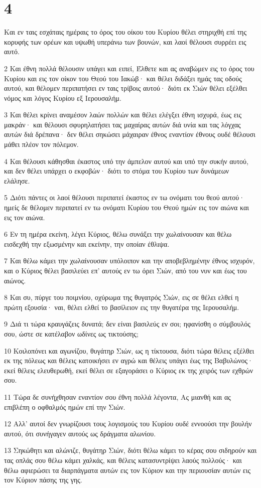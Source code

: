\chapter{4}

\par Και εν ταις εσχάταις ημέραις το όρος του οίκου του Κυρίου θέλει στηριχθή επί της κορυφής των ορέων και υψωθή υπεράνω των βουνών, και λαοί θέλουσι συρρέει εις αυτό.
\par 2 Και έθνη πολλά θέλουσιν υπάγει και ειπεί, Έλθετε και ας αναβώμεν εις το όρος του Κυρίου και εις τον οίκον του Θεού του Ιακώβ· και θέλει διδάξει ημάς τας οδούς αυτού, και θέλομεν περιπατήσει εν ταις τρίβοις αυτού· διότι εκ Σιών θέλει εξέλθει νόμος και λόγος Κυρίου εξ Ιερουσαλήμ.
\par 3 Και θέλει κρίνει αναμέσον λαών πολλών και θέλει ελέγξει έθνη ισχυρά, έως εις μακράν· και θέλουσι σφυρηλατήσει τας μαχαίρας αυτών διά υνία και τας λόγχας αυτών διά δρέπανα· δεν θέλει σηκώσει μάχαιραν έθνος εναντίον έθνους ουδέ θέλουσι μάθει πλέον τον πόλεμον.
\par 4 Και θέλουσι κάθησθαι έκαστος υπό την άμπελον αυτού και υπό την συκήν αυτού, και δεν θέλει υπάρχει ο εκφοβών· διότι το στόμα του Κυρίου των δυνάμεων ελάλησε.
\par 5 Διότι πάντες οι λαοί θέλουσι περιπατεί έκαστος εν τω ονόματι του θεού αυτού· ημείς δε θέλομεν περιπατεί εν τω ονόματι Κυρίου του Θεού ημών εις τον αιώνα και εις τον αιώνα.
\par 6 Εν τη ημέρα εκείνη, λέγει Κύριος, θέλω συνάξει την χωλαίνουσαν και θέλω εισδεχθή την εξωσμένην και εκείνην, την οποίαν έθλιψα.
\par 7 Και θέλω κάμει την χωλαίνουσαν υπόλοιπον και την αποβεβλημένην έθνος ισχυρόν, και ο Κύριος θέλει βασιλεύει επ' αυτούς εν τω όρει Σιών, από του νυν και έως του αιώνος.
\par 8 Και συ, πύργε του ποιμνίου, οχύρωμα της θυγατρός Σιών, εις σε θέλει ελθεί η πρώτη εξουσία· ναι, θέλει ελθεί το βασίλειον εις την θυγατέρα της Ιερουσαλήμ.
\par 9 Διά τι τώρα κραυγάζεις δυνατά; δεν είναι βασιλεύς εν σοι; ηφανίσθη ο σύμβουλός σου, ώστε σε κατέλαβον ωδίνες ως τικτούσης;
\par 10 Κοιλοπόνει και αγωνίζου, θυγάτηρ Σιών, ως η τίκτουσα, διότι τώρα θέλεις εξέλθει εκ της πόλεως και θέλεις κατοικήσει εν αγρώ και θέλεις υπάγει έως της Βαβυλώνος· εκεί θέλεις ελευθερωθή, εκεί θέλει σε εξαγοράσει ο Κύριος εκ της χειρός των εχθρών σου.
\par 11 Τώρα δε συνήχθησαν εναντίον σου έθνη πολλά λέγοντα, Ας μιανθή και ας επιβλέπη ο οφθαλμός ημών επί την Σιών.
\par 12 Αλλ' αυτοί δεν γνωρίζουσι τους λογισμούς του Κυρίου ουδέ εννοούσι την βουλήν αυτού, ότι συνήγαγεν αυτούς ως δράγματα αλωνίου.
\par 13 Σηκώθητι και αλώνιζε, θυγάτηρ Σιών, διότι θέλω κάμει το κέρας σου σιδηρούν και τας οπλάς σου θέλω κάμει χαλκάς, και θέλεις κατασυντρίψει λαούς πολλούς· και θέλω αφιερώσει τα διαρπάγματα αυτών εις τον Κύριον και την περιουσίαν αυτών εις τον Κύριον πάσης της γης.

